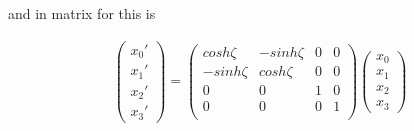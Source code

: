 \documentclass[11pt]{article}
\begin{document}
and in matrix for this is

\begin{align*}
\begin{pmatrix} x_{0}' \\ x_{1}' \\ x_{2}' \\ x_{3}' \end{pmatrix} =
\begin{pmatrix} 
cosh \zeta & -sinh \zeta & 0 & 0 \\ 
-sinh \zeta & cosh \zeta & 0 & 0 \\ 
0 & 0 & 1 & 0 \\ 
0 & 0 & 0 & 1 \\ 
\end{pmatrix}
\begin{pmatrix} x_{0} \\ x_{1} \\ x_{2} \\ x_{3}  \end{pmatrix} 
\end{align*}

\clearpage


%

\clearpage


\end{document}
